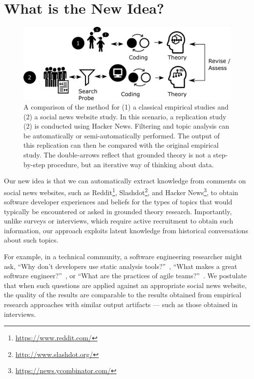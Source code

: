 \documentclass{sig-alternate}
\begin{document}
\section{What is the New Idea?}

\begin{figure}
\centering
\includegraphics[width=\linewidth]{concept}
\caption{A comparison of the method for (1) a classical empirical studies and (2) a social news website study. In this scenario, a replication study (2) is conducted using Hacker News. Filtering and topic analysis can be automatically or semi-automatically performed. The output of this replication can then be compared with the original empirical study. The double-arrows reflect that grounded theory is not a step-by-step procedure, but an iterative way of thinking about data.\label{fig:concept}}
\end{figure}

Our new idea is that we can automatically extract knowledge from comments on social news websites, such as Reddit\footnote{\url{https://www.reddit.com/}}, Slashdot\footnote{\url{http://www.slashdot.org/}}, and Hacker News\footnote{\url{https://news.ycombinator.com/}}, to obtain software developer experiences and beliefs for the types of topics that would typically be encountered or asked in grounded theory research. Importantly, unlike surveys or interviews, which require active recruitment to obtain such information, our approach exploits latent knowledge from historical conversations about such topics.

For example, in a technical community, a software engineering researcher might ask, ``Why don't developers use static analysis tools?''~\cite{Johnson2013a}, ``What makes a great software engineer?''~\cite{Li2015}, or ``What are the practices of agile teams?''~\cite{Hoda2011}. We postulate that when such questions are applied against an appropriate social news website, the quality of the results are comparable to the results obtained from empirical research approaches with similar output artifacts --- such as those obtained in interviews.
\end{document}
